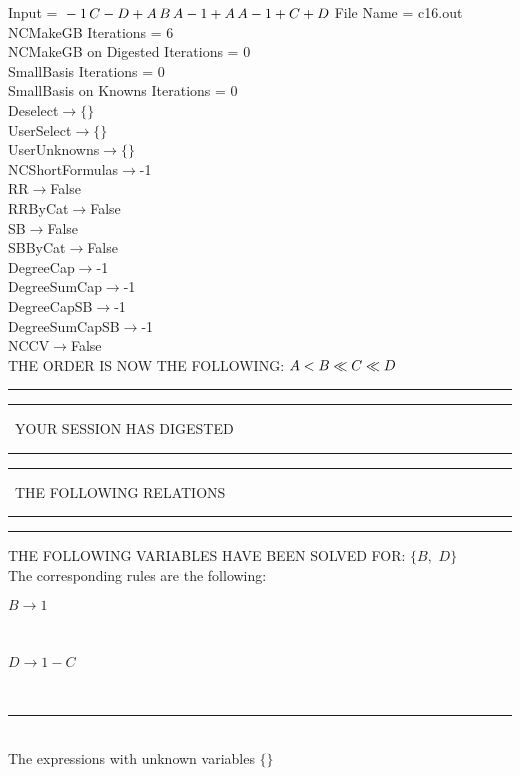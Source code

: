 \documentclass[rep10,leqno]{report}
\begin{document}
\normalsize
\baselineskip=12pt
\noindent
Input = 
$
\\-1\,
 C - D + A\,
 B\,
 A\\
-1 + A\,
 A\\
-1 + C + D\\
$
File Name = c16.out\\
NCMakeGB Iterations = 6\\
NCMakeGB on Digested Iterations = 0\\
SmallBasis Iterations = 0\\
SmallBasis on Knowns Iterations = 0\\
Deselect$\rightarrow \{\}$\\
UserSelect$\rightarrow \{\}$\\
UserUnknowns$\rightarrow \{\}$\\
NCShortFormulas$\rightarrow$-1\\
RR$\rightarrow $False\\
RRByCat$\rightarrow $False\\
SB$\rightarrow $False\\
SBByCat$\rightarrow $False\\
DegreeCap$\rightarrow $-1\\
DegreeSumCap$\rightarrow $-1\\
DegreeCapSB$\rightarrow $-1\\
DegreeSumCapSB$\rightarrow $-1\\
NCCV$\rightarrow $False\\
THE ORDER IS NOW THE FOLLOWING:\hfil\break
$
A<B\ll
C\ll
D\\
$
\rule[2pt]{6in}{4pt}\hfil\break
\rule[2pt]{1.879in}{4pt}
\ YOUR SESSION HAS DIGESTED\ 
\rule[2pt]{1.879in}{4pt}\hfil\break
\rule[2pt]{1.923in}{4pt}
\ THE FOLLOWING RELATIONS\ 
\rule[2pt]{1.923in}{4pt}\hfil\break
\rule[2pt]{6in}{4pt}\hfil\break
THE FOLLOWING VARIABLES HAVE BEEN SOLVED FOR:\hfil\break
$\{B,
$ $
D\}$
\smallskip\\
The corresponding rules are the following:\smallskip\\
\begin{minipage}{6in}
$
B\rightarrow 1
$
\end{minipage}\medskip\\
\begin{minipage}{6in}
$
D\rightarrow 1 - C
$
\end{minipage}\medskip\\
\rule[3pt]{6in}{.7pt}\\
The expressions with unknown variables $\{\}$\\
\end{document}

